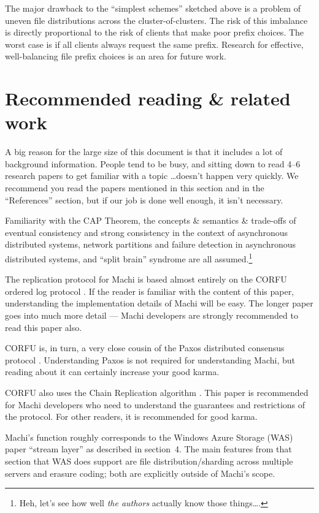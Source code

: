 \documentclass[preprint,10pt]{sigplanconf}
\begin{document}
The major drawback to the ``simplest schemes'' sketched above is a
problem of uneven file distributions across the cluster-of-clusters.
The risk of this imbalance is directly proportional to the risk of
clients that make poor prefix choices.  The worst case is if all
clients always request the same prefix.  Research for effective,
well-balancing file prefix choices is an area for future work.

\section{Recommended reading \& related work}

A big reason for the large size of this document is that it includes a
lot of background information.
People tend to be busy, and sitting down to
read 4--6 research papers to get familiar with a topic \ldots doesn't
happen very quickly.  We recommend you read the papers mentioned in
this section and in the ``References'' section, but if our job is
done well enough, it isn't necessary.

Familiarity with the CAP Theorem, the concepts \& semantics \&
trade-offs of eventual consistency and strong consistency in the
context of asynchronous distributed systems, network partitions and
failure detection in asynchronous distributed systems, and ``split
brain'' syndrome are all assumed.\footnote{Heh, let's see how well
{\em the authors} actually know those things\ldots.}

The replication protocol for Machi is based almost entirely on the CORFU
ordered log protocol \cite{corfu1}.  If the reader is familiar with
the content of this paper, understanding the implementation details of
Machi will be easy.  The longer paper \cite{corfu2} goes into much
more detail --- Machi developers are strongly recommended to read this paper
also.

CORFU is, in turn, a very close cousin of the Paxos distributed
consensus protocol \cite{paxos-made-simple}.  Understanding Paxos is
not required for understanding Machi, but reading about it can certainly
increase your good karma.

CORFU also uses the Chain Replication algorithm
\cite{chain-replication}.  This paper is recommended for Machi
developers who need to understand the guarantees and restrictions of
the protocol.  For other readers, it is recommended for good karma.

 Machi's function
roughly corresponds to the Windows Azure Storage (WAS) paper \cite{was}
``stream layer'' as described in section~4.
The main features from that section that WAS does support are file
distribution/sharding across multiple servers and erasure coding; both
are explicitly outside of Machi's scope.
\end{document}
